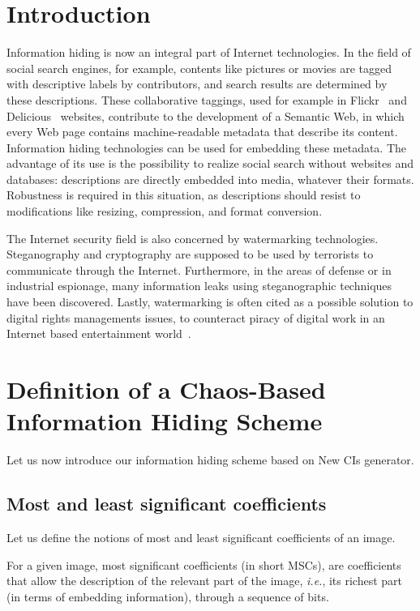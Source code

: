 \section{Introduction}

Information hiding is now an integral part of Internet technologies. In the field of social search engines, for example, contents like pictures or movies are tagged with descriptive labels by contributors, and search results are determined by these descriptions. These collaborative taggings, used for example in Flickr~\cite{Frick} and Delicious~\cite{Delicious} websites, contribute to the development of a Semantic Web, in which every Web page contains machine-readable metadata that describe its content. Information hiding technologies can be used for embedding these metadata. The advantage of its use is the possibility to realize  social search without websites and databases: descriptions are directly embedded into media, whatever their formats. Robustness is required in this situation, as descriptions should resist to modifications like resizing, compression, and format conversion.

The Internet security field is also concerned by watermarking technologies. Steganography and cryptography are supposed to be used by terrorists to communicate through the Internet. Furthermore, in the areas of defense or in industrial espionage, many information leaks using steganographic techniques have been discovered. Lastly, watermarking is often cited as a possible solution to digital rights managements issues, to counteract piracy of digital work in an Internet based entertainment world~\cite{Nakashima2003}.


\section{Definition of a Chaos-Based Information Hiding Scheme}
\label{sec:Algo}

Let us now introduce our information hiding scheme based on New CIs generator.


\subsection{Most and least significant coefficients}

Let us define the notions of most and least significant coefficients of an image.

\begin{Definition}
\label{definitionMSC}
For a given image, most significant coefficients (in short MSCs), are coefficients that allow the description of the relevant part of the image, \emph{i.e.}, its richest part (in terms of embedding information), through a sequence of bits.
\end{Definition}

